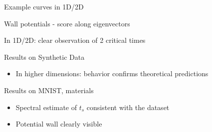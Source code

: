 \documentclass[aspectratio=169]{beamer}
\begin{document}
\begin{frame}{Example curves in 1D/2D}
    
    \item Wall potentials - score along eigenvectors
    \item In 1D/2D: clear observation of 2 critical times
    \begin{center}
    \end{center}
\end{frame}



\begin{frame}{Results on Synthetic Data}
    \begin{itemize}
        \item In higher dimensions: behavior confirms theoretical predictions
    \end{itemize}
    
    \begin{center}
    \end{center}
\end{frame}


\begin{frame}{Results on MNIST, materials}
    \begin{itemize}
        \item Spectral estimate of $t_s$ consistent with the dataset
        \item Potential wall clearly visible
    \end{itemize}

    
    
    \begin{center}
    \end{center}
\end{frame}
\end{document}
